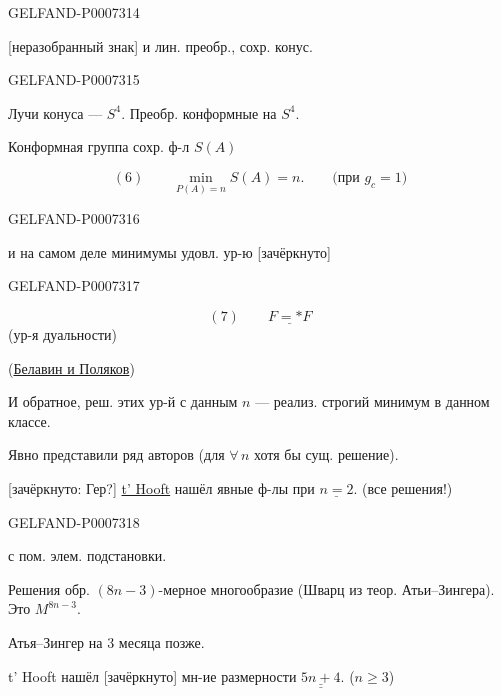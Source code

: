 \begin{GelfandAdjacentEvidence}{GELFAND-P000731}{4}

[неразобранный знак] и лин. преобр., сохр. конус.
\end{GelfandAdjacentEvidence}
\begin{GelfandAdjacentEvidence}{GELFAND-P000731}{5}


Лучи конуса --- \(S^4\). Преобр. конформные на \(S^4\).

Конформная группа сохр. ф-л \(S(A)\)

\[
(6)\qquad \min_{P(A)=n}S(A)=n.\qquad \text{(при }g_c=1\text{)}
\]
\end{GelfandAdjacentEvidence}
\begin{GelfandAdjacentEvidence}{GELFAND-P000731}{6}


и на самом деле минимумы удовл. ур-ю [зачёркнуто]
\end{GelfandAdjacentEvidence}
\begin{GelfandAdjacentEvidence}{GELFAND-P000731}{7}

\[
(7)\qquad \underline{F={*}F}
\]
(ур-я дуальности)

(\href{https://doi.org/10.1016/0370-2693(75)90163-X}{Белавин и Поляков})

И обратное, реш. этих ур-й с данным \(n\) --- реализ. строгий минимум в данном классе.

Явно представили ряд авторов (для \(\forall\,n\) хотя бы сущ. решение).

[зачёркнуто: Гер?] \underline{t' Hooft} нашёл явные ф-лы при \(\underline{n=2}\). (все решения!)
\end{GelfandAdjacentEvidence}
\begin{GelfandAdjacentEvidence}{GELFAND-P000731}{8}


с пом. элем. подстановки.

Решения обр. \((8n-3)\)-мерное многообразие
(Шварц из теор. Атьи--Зингера). Это \(M^{8n-3}\).

Атья--Зингер на 3 месяца позже.

t' Hooft нашёл [зачёркнуто] мн-ие размерности \(\underline{\underline{5n+4}}\). (\(n\geq3\))
\end{GelfandAdjacentEvidence}
